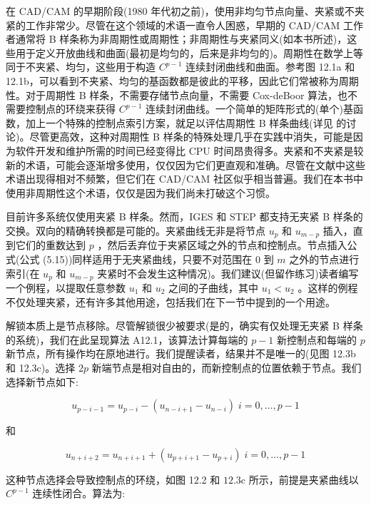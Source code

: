 \documentclass[../main.tex]{subfiles}
\begin{document}
在 CAD/CAM 的早期阶段(1980 年代初之前)，使用非均匀节点向量、夹紧或不夹紧的工作非常少。尽管在这个领域的术语一直令人困惑，早期的 CAD/CAM 工作者通常将 B 样条称为非周期性或周期性；非周期性与夹紧同义(如本书所述)，这些用于定义开放曲线和曲面(最初是均匀的，后来是非均匀的)。周期性在数学上等同于不夹紧、均匀，这些用于构造 \({C}^{p - 1}\) 连续封闭曲线和曲面。参考图 12.1a 和 12.1b，可以看到不夹紧、均匀的基函数都是彼此的平移，因此它们常被称为周期性。对于周期性 B 样条，不需要存储节点向量，不需要 Cox-deBoor 算法，也不需要控制点的环绕来获得 \({C}^{p - 1}\) 连续封闭曲线。一个简单的矩阵形式的(单个)基函数，加上一个特殊的控制点索引方案，就足以评估周期性 B 样条曲线(详见 \cite{Mort85} 的讨论)。尽管更高效，这种对周期性 B 样条的特殊处理几乎在实践中消失，可能是因为软件开发和维护所需的时间已经变得比 CPU 时间昂贵得多。夹紧和不夹紧是较新的术语，可能会逐渐增多使用，仅仅因为它们更直观和准确。尽管在文献中这些术语出现得相对不频繁，但它们在 CAD/CAM 社区似乎相当普遍。我们在本书中使用非周期性这个术语，仅仅是因为我们尚未打破这个习惯。


目前许多系统仅使用夹紧 B 样条。然而，IGES 和 STEP 都支持无夹紧 B 样条的交换。双向的精确转换都是可能的。夹紧曲线无非是将节点 \({u}_{p}\) 和 \({u}_{m - p}\) 插入，直到它们的重数达到 \(p\) ，然后丢弃位于夹紧区域之外的节点和控制点。节点插入公式(公式 (5.15))同样适用于无夹紧曲线，只要不对范围在 0 到 \(m\) 之外的节点进行索引(在 \({u}_{p}\) 和 \({u}_{m - p}\) 夹紧时不会发生这种情况)。我们建议(但留作练习)读者编写一个例程，以提取任意参数 \({u}_{1}\) 和 \({u}_{2}\) 之间的子曲线，其中 \({u}_{1} < {u}_{2}\) 。这样的例程不仅处理夹紧，还有许多其他用途，包括我们在下一节中提到的一个用途。



解锁本质上是节点移除。尽管解锁很少被要求(是的，确实有仅处理无夹紧 B 样条的系统)，我们在此呈现算法 A12.1，该算法计算每端的 \(p - 1\) 新控制点和每端的 \(p\) 新节点，所有操作均在原地进行。我们提醒读者，结果并不是唯一的(见图 12.3b 和 12.3c)。选择 \({2p}\) 新端节点是相对自由的，而新控制点的位置依赖于节点。我们选择新节点如下:

\[
{u}_{p - i - 1} = {u}_{p - i} - \left( {{u}_{n - i + 1} - {u}_{n - i}}\right) \;i = 0,\ldots ,p - 1 \tag{12.1}
\]

和

\[
{u}_{n + i + 2} = {u}_{n + i + 1} + \left( {{u}_{p + i + 1} - {u}_{p + i}}\right) \;i = 0,\ldots ,p - 1 \tag{12.2}
\]

这种节点选择会导致控制点的环绕，如图 12.2 和 \({12.3}\mathrm{c}\) 所示，前提是夹紧曲线以 \({C}^{p - 1}\) 连续性闭合。算法为:
\end{document}
